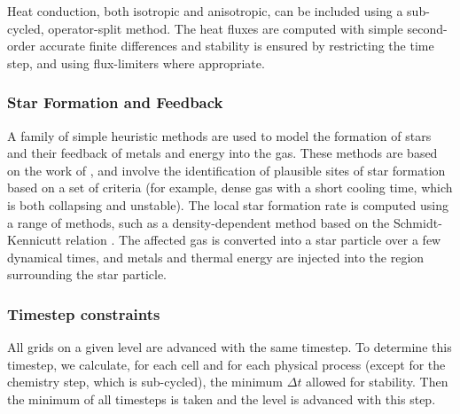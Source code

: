 Heat conduction, both isotropic and anisotropic, can be included using
a sub-cycled, operator-split method.  The heat fluxes are computed
with simple second-order accurate finite differences and stability is
ensured by restricting the time step, and using flux-limiters where
appropriate.

\subsubsection{Star Formation and Feedback}

A family of simple heuristic methods are used to model the formation
of stars and their feedback of metals and energy into the gas.  These
methods are based on the work of \citet{CO1992}, and involve the
identification of plausible sites of star formation based on a set of
criteria (for example, dense gas with a short cooling time, which is
both collapsing and unstable).  The local star formation rate is
computed using a range of methods, such as a density-dependent method
based on the Schmidt-Kennicutt relation \citep{K89}.  The affected gas
is converted into a star particle over a few dynamical times, and
metals and thermal energy are injected into the region surrounding the
star particle.

\subsubsection{Timestep constraints}

All grids on a given level are advanced with the same timestep.  To
determine this timestep, we calculate, for each cell and for each
physical process (except for the chemistry step, which is sub-cycled),
the minimum $\Delta t$ allowed for stability.  Then the minimum of all
timesteps is taken and the level is advanced with this step.


